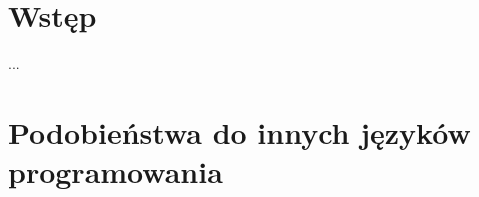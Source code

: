 \documentclass[mgr, shortabstract]{iithesis}
\author         {Maksymilian Debeściak}
\begin{document}

\chapter{Wstęp}
\label{ch:wstep}

...

\chapter{Podobieństwa do innych języków programowania}
\label{ch:podobienstwa_do_innych}







\end{document}
